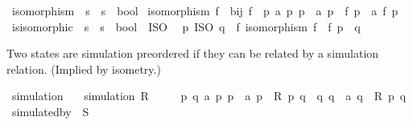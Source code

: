 \begin{isabellebody}
\isamarkupfalse%
\ isomorphism\ {\isacharcolon}{\kern0pt}{\isacharcolon}{\kern0pt}\ {\isacartoucheopen}{\isacharparenleft}{\kern0pt}{\isacharprime}{\kern0pt}s\ {\isasymRightarrow}\ {\isacharprime}{\kern0pt}s{\isacharparenright}{\kern0pt}\ {\isasymRightarrow}\ bool{\isacartoucheclose}\ \isanewline
{\isacartoucheopen}isomorphism\ f\ {\isasymequiv}\ bij\ f\ {\isasymand}\ {\isacharparenleft}{\kern0pt}{\isasymforall}p\ a\ p{\isacharprime}{\kern0pt}{\isachardot}{\kern0pt}\ p\ {\isasymmapsto}\ a\ p{\isacharprime}{\kern0pt}\ {\isasymlongleftrightarrow}\ f\ p\ {\isasymmapsto}\ a\ {\isacharparenleft}{\kern0pt}f\ p{\isacharprime}{\kern0pt}{\isacharparenright}{\kern0pt}{\isacharparenright}{\kern0pt}{\isacartoucheclose}\isanewline
\isanewline
{}\isamarkupfalse%
\ is{\isacharunderscore}{\kern0pt}isomorphic\ {\isacharcolon}{\kern0pt}{\isacharcolon}{\kern0pt}\ {\isacartoucheopen}{\isacharprime}{\kern0pt}s\ {\isasymRightarrow}\ {\isacharprime}{\kern0pt}s\ {\isasymRightarrow}\ bool{\isacartoucheclose}\ {\isacharparenleft}{\kern0pt}\ {\isacartoucheopen}{\isasymsimeq}ISO{\isacartoucheclose}\ {}{}{\isacharparenright}{\kern0pt}\ \isanewline
{\isacartoucheopen}p\ {\isasymsimeq}ISO\ q\ {\isasymequiv}\ {\isasymexists}f{\isachardot}{\kern0pt}\ isomorphism\ f\ {\isasymand}\ {\isacharparenleft}{\kern0pt}f\ p{\isacharparenright}{\kern0pt}\ {\isacharequal}{\kern0pt}\ q{\isacartoucheclose}%
\begin{isamarkuptext}%
Two states are simulation preordered if they can be related by
  a simulation relation. (Implied by isometry.)%
\end{isamarkuptext}\isamarkuptrue%
\isamarkupfalse%
\ simulation\isanewline
\ \ \ {\isacartoucheopen}simulation\ R\ {\isasymequiv}\isanewline
\ \ \ \ {\isasymforall}p\ q\ a\ p{\isacharprime}{\kern0pt}{\isachardot}{\kern0pt}\ p\ {\isasymmapsto}\ a\ p{\isacharprime}{\kern0pt}\ {\isasymand}\ R\ p\ q\ {\isasymlongrightarrow}\ {\isacharparenleft}{\kern0pt}{\isasymexists}q{\isacharprime}{\kern0pt}{\isachardot}{\kern0pt}\ q\ {\isasymmapsto}\ a\ q{\isacharprime}{\kern0pt}\ {\isasymand}\ R\ p{\isacharprime}{\kern0pt}\ q{\isacharprime}{\kern0pt}{\isacharparenright}{\kern0pt}{\isacartoucheclose}\isanewline
\isanewline
{}\isamarkupfalse%
\ simulated{\isacharunderscore}{\kern0pt}by\ {\isacharparenleft}{\kern0pt}\ {\isacartoucheopen}{\isasymlesssim}S{\isacartoucheclose}\ {}{}{\isacharparenright}{\kern0pt}\isanewline

\end{isabellebody}
